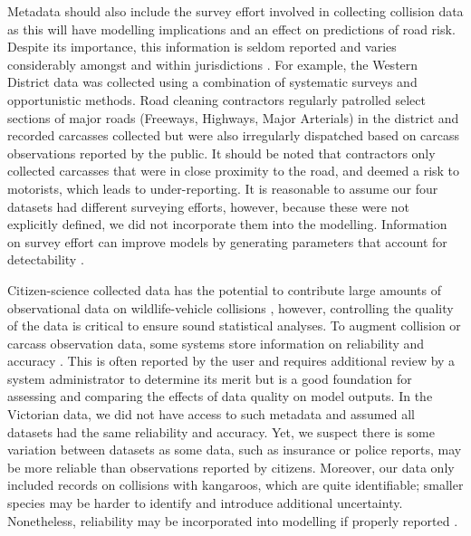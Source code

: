 Metadata should also include the survey effort involved in collecting collision data as this will have modelling implications and an effect on predictions of road risk. Despite its importance, this information is seldom reported and varies considerably amongst and within jurisdictions \citep{huij07a}. For example, the Western District data was collected using a combination of systematic surveys and opportunistic methods. Road cleaning contractors regularly patrolled select sections of major roads (Freeways, Highways, Major Arterials) in the district and recorded carcasses collected but were also irregularly dispatched based on carcass observations reported by the public. It should be noted that contractors only collected carcasses that were in close proximity to the road, and deemed a risk to motorists, which leads to under-reporting. It is reasonable to assume our four datasets had different surveying efforts, however, because these were not explicitly defined, we did not incorporate them into the modelling. Information on survey effort can improve models by generating parameters that account for detectability \citep[see][]{dora14}.

Citizen-science collected data has the potential to contribute large amounts of observational data on wildlife-vehicle collisions \citep[e.g.][]{cose14,dwye16,paul14}, however, controlling the quality of the data is critical to ensure sound statistical analyses. To augment collision or carcass observation data, some systems store information on reliability and accuracy \citep[e.g.][]{shil15a}. This is often reported by the user and requires additional review by a system administrator to determine its merit but is a good foundation for assessing and comparing the effects of data quality on model outputs. In the Victorian data, we did not have access to such metadata and assumed all datasets had the same reliability and accuracy. Yet, we suspect there is some variation between datasets as some data, such as insurance or police reports, may be more reliable than observations reported by citizens. Moreover, our data only included records on collisions with kangaroos, which are quite identifiable; smaller species may be harder to identify and introduce additional uncertainty. Nonetheless, reliability may be incorporated into modelling if properly reported \citep[see][]{guns09}.

